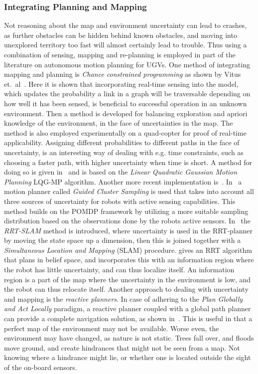 \subsubsection{Integrating Planning and Mapping}
Not reasoning about the map and environment uncertainty can lead to crashes, as
further obstacles can be hidden behind known obstacles, and moving into
unexplored territory too fast will almost certainly lead to trouble. Thus using
a combination of sensing, mapping and re-planning is employed in part of the
literature on autonomous motion planning for UGVs. One method of integrating
mapping and planning is \textit{Chance constrained programming } as shown by
Vitus et.\ al~\cite{vitusHierarchicalMethodStochastic2012}. Here it is shown
that incorporating real-time sensing into the model, which updates the
probability a link in a graph will be traversable depending on how well it has
been sensed, is beneficial to successful operation in an unknown environment.
Then a method is developed for balancing exploration and apriori knowledge of
the environment, in the face of uncertainties in the map. The method is also
employed experimentally on a quad-copter for proof of real-time applicability.
Assigning different probabilities to different paths in the face of uncertainty,
is an interesting way of dealing with e.g. time constraints, such as choosing a
faster path, with higher uncertainty when time is short. A method for doing so
is given in~\cite{vandenbergLQGMPOptimizedPath2011} and is based on the
\textit{Linear Quadratic Gaussian Motion Planning} LQG-MP algorithm. Another
more recent implementation is~\cite{blakeEfficientComputationCollision2018}.
In~\cite{Kurniawati_2011} a motion planner called \textit{Guided Cluster
  Sampling} is used that takes into account all three sources of uncertainty for
robots with active sensing capabilities. This method builds on the POMDP
framework by utilizing a more suitable sampling distribution based on the
observations done by the robots active sensors.
In~\cite{huangRRTSLAMMotionPlanning2008} the \textit{RRT-SLAM} method is
introduced, where uncertainty is used in the RRT-planner by moving the state
space up a dimension, then this is joined together with a \textit{Simultaneous
  Location and Mapping} (SLAM) procedure.
\cite{bryRapidlyexploringRandomBelief2011} gives an RRT algorithm that plans in
belief space, and incorporates this with an information region where the robot
has little uncertainty, and can thus localize itself. An information region is a
part of the map where the uncertainty in the environment is low, and the robot
can thus relocate itself. Another approach to dealing with uncertainty and
mapping is the \textit{reactive planners}. In case of adhering to the
\textit{Plan Globally and Act Locally} paradigm, a reactive planner coupled with
a global path planner can provide a complete navigation solution, as shown
in~\cite{djekouneSensorBasedNavigation2009}. This is useful in that a perfect
map of the environment may not be available. Worse even, the environment may
have changed, as nature is not static. Trees fall over, and floods move ground,
and create hindrances that might not be seen from a map. Not knowing where a
hindrance might lie, or whether one is located outside the sight of the on-board
sensors.

